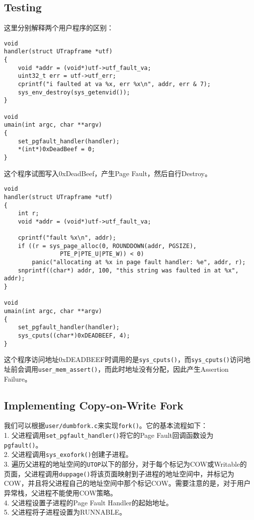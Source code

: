 \documentclass[11pt]{article}
\begin{document}
\subsection{Testing}
这里分别解释两个用户程序的区别：

\begin{lstlisting}[title=user/faultdie.c]
void
handler(struct UTrapframe *utf)
{
	void *addr = (void*)utf->utf_fault_va;
	uint32_t err = utf->utf_err;
	cprintf("i faulted at va %x, err %x\n", addr, err & 7);
	sys_env_destroy(sys_getenvid());
}

void
umain(int argc, char **argv)
{
	set_pgfault_handler(handler);
	*(int*)0xDeadBeef = 0;
}
\end{lstlisting}
这个程序试图写入0xDeadBeef，产生Page Fault，然后自行Destroy。

\begin{lstlisting}[title=user/faultallocbad.c]
void
handler(struct UTrapframe *utf)
{
	int r;
	void *addr = (void*)utf->utf_fault_va;

	cprintf("fault %x\n", addr);
	if ((r = sys_page_alloc(0, ROUNDDOWN(addr, PGSIZE),
				PTE_P|PTE_U|PTE_W)) < 0)
		panic("allocating at %x in page fault handler: %e", addr, r);
	snprintf((char*) addr, 100, "this string was faulted in at %x", addr);
}

void
umain(int argc, char **argv)
{
	set_pgfault_handler(handler);
	sys_cputs((char*)0xDEADBEEF, 4);
}
\end{lstlisting}
这个程序访问地址0xDEADBEEF时调用的是\lstinline|sys_cputs()|，而\lstinline|sys_cputs()|访问地址前会调用\lstinline|user_mem_assert()|，而此时地址没有分配，因此产生Assertion Failure。 

\subsection{Implementing Copy-on-Write Fork}
我们可以根据\lstinline|user/dumbfork.c|来实现\lstinline|fork()|。它的基本流程如下：\\
1. 父进程调用\lstinline|set_pgfault_handler()|将它的Page Fault回调函数设为\lstinline|pgfault()|。\\
2. 父进程调用\lstinline|sys_exofork()|创建子进程。\\
3. 遍历父进程的地址空间的\lstinline|UTOP|以下的部分，对于每个标记为COW或Writable的页面，父进程调用\lstinline|duppage()|将该页面映射到子进程的地址空间中，并标记为COW，并且将父进程自己的地址空间中那个标记COW。需要注意的是，对于用户异常栈，父进程不能使用COW策略。\\
4. 父进程设置子进程的Page Fault Handler的起始地址。 \\
5. 父进程将子进程设置为RUNNABLE。\\
\end{document}
